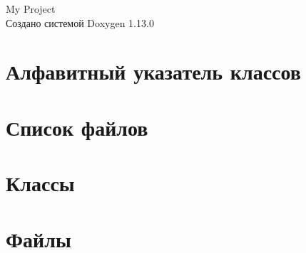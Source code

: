 \documentclass[twoside]{book}
\newcommand{\+}{\discretionary{\mbox{\scriptsize$\hookleftarrow$}}{}{}}
\newcommand{\clearemptydoublepage}{%
    \newpage{\pagestyle{empty}\cleardoublepage}%
  }
\begin{document}
  \raggedbottom
    \hypersetup{pageanchor=false,
                bookmarksnumbered=true,
                pdfencoding=unicode
               }
  \begin{titlepage}
  \vspace*{7cm}
  \begin{center}%
  {\Large My Project}\\
  \vspace*{1cm}
  {\large Создано системой Doxygen 1.13.0}\\
  \end{center}
  \end{titlepage}
  \clearemptydoublepage
  \tableofcontents
  \clearemptydoublepage
  \hypersetup{pageanchor=true}
\chapter{Алфавитный указатель классов}

\chapter{Список файлов}

\chapter{Классы}

\chapter{Файлы}


  \backmatter
  \newpage
  \clearemptydoublepage
  \printindex
\end{document}

